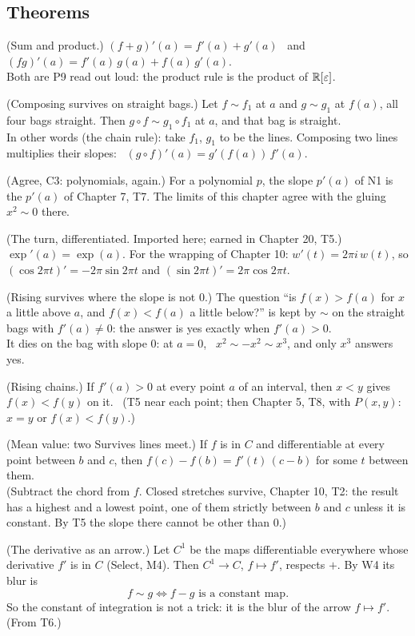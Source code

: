\subsection*{Theorems}

\begin{lines}
\item[\lab{T1}] (Sum and product.) $(f + g)'(a) = f'(a) + g'(a)$ \ and \ $(f g)'(a) = f'(a)\,g(a) + f(a)\,g'(a)$. \\
Both are P9 read out loud: the product rule is the product of $\mathbb{R}[\varepsilon]$.
\item[\lab{T2}] (Composing survives on straight bags.) Let $f \sim f_1$ at $a$ and $g \sim g_1$ at $f(a)$, all four bags straight. Then $g \circ f \sim g_1 \circ f_1$ at $a$, and that bag is straight. \\
In other words (the chain rule): take $f_1$, $g_1$ to be the lines. Composing two lines multiplies their slopes: \ $(g \circ f)'(a) = g'(f(a))\,f'(a)$.
\item[\lab{T3}] (Agree, C3: polynomials, again.) For a polynomial $p$, the slope $p'(a)$ of N1 is the $p'(a)$ of Chapter 7, T7. The limits of this chapter agree with the gluing $x^2 \sim 0$ there.
\item[\lab{T4}] (The turn, differentiated. Imported here; earned in Chapter 20, T5.) $\exp'(a) = \exp(a)$. For the wrapping of Chapter 10: $w'(t) = 2\pi i\,w(t)$, so $(\cos 2\pi t)' = -2\pi \sin 2\pi t$ and $(\sin 2\pi t)' = 2\pi \cos 2\pi t$.
\item[\lab{T5}] (Rising survives where the slope is not $0$.) The question ``is $f(x) > f(a)$ for $x$ a little above $a$, and $f(x) < f(a)$ a little below?'' is kept by $\sim$ on the straight bags with $f'(a) \neq 0$: the answer is yes exactly when $f'(a) > 0$. \\
It dies on the bag with slope $0$: at $a = 0$, \ $x^2 \sim -x^2 \sim x^3$, and only $x^3$ answers yes.
\item[\lab{T5.1}] (Rising chains.) If $f'(a) > 0$ at every point $a$ of an interval, then $x < y$ gives $f(x) < f(y)$ on it. \ (T5 near each point; then Chapter 5, T8, with $P(x, y)$: $x = y$ or $f(x) < f(y)$.)
\item[\lab{T6}] (Mean value: two Survives lines meet.) If $f$ is in $C$ and differentiable at every point between $b$ and $c$, then $f(c) - f(b) = f'(t)\,(c - b)$ for some $t$ between them. \\
(Subtract the chord from $f$. Closed stretches survive, Chapter 10, T2: the result has a highest and a lowest point, one of them strictly between $b$ and $c$ unless it is constant. By T5 the slope there cannot be other than $0$.)
\item[\lab{T7}] (The derivative as an arrow.) Let $C^1$ be the maps differentiable everywhere whose derivative $f'$ is in $C$ (Select, M4). Then $C^1 \to C$, $f \mapsto f'$, respects $+$. By W4 its blur is
\[
f \sim g \iff f - g \text{ is a constant map.}
\]
So the constant of integration is not a trick: it is the blur of the arrow $f \mapsto f'$. (From T6.)
\end{lines}


